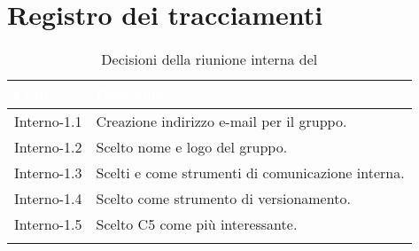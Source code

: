 \section{Registro dei tracciamenti}
{
\renewcommand{\arraystretch}{1.5}
\centering
\begin{longtable}{C{3cm} C{9cm}}
\textcolor{white}{\textbf{Codice}}&
\textcolor{white}{\textbf{Decisione}}\\	
\endhead
		
Interno-1.1 & Creazione indirizzo e-mail per il gruppo.\\

Interno-1.2 & Scelto nome e logo del gruppo.\\

Interno-1.3 & Scelti  e  come strumenti di comunicazione interna.\\

Interno-1.4 & Scelto  come strumento di versionamento.\\

Interno-1.5 & Scelto C5 come  più interessante.\\
		
\caption{Decisioni della riunione interna del \Data{}}		
\end{longtable}
}
